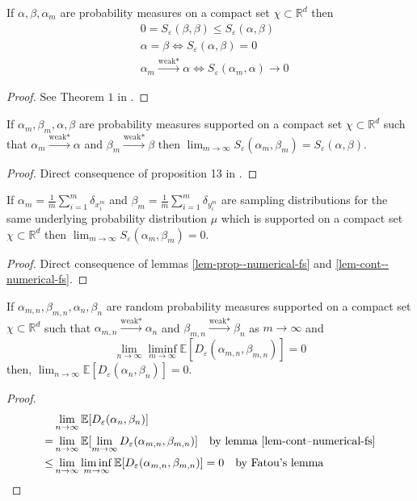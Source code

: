 \begin{lem} If $\alpha, \beta, \alpha_m$ are probability measures on a compact set $\chi\subset\mathbb R^d$ then
\begin{align}
     & 0=S_\varepsilon(\beta, \beta)\le S_\varepsilon(\alpha, \beta)\\
     & \alpha=\beta\iff S_\varepsilon(\alpha, \beta)=0\\
     & \alpha_m\stackrel{\text{weak*}}{\longrightarrow}\alpha\iff S_\varepsilon(\alpha_m, \alpha)\to0
\end{align}
\begin{proof}
See Theorem $1$ in \cite{feydy2019interpolating}.
\end{proof}
\label{lem-prop--numerical-fs}
\end{lem}

\begin{lem}
If $\alpha_m, \beta_m, \alpha, \beta$ are probability measures supported on a compact set $\chi\subset\mathbb R^d$ such that $\alpha_m\stackrel{\text{weak*}}{\longrightarrow}\alpha$ and $\beta_m\stackrel{\text{weak*}}{\longrightarrow}\beta$ then $\lim_{m\to\infty}S_\varepsilon(\alpha_m, \beta_m)= S_\varepsilon(\alpha, \beta)$.
\label{lem-cont--numerical-fs}
\end{lem}
\begin{proof} Direct consequence of proposition 13 in \cite{feydy2019interpolating}.
\end{proof}
\begin{thm}
If $\alpha_m =\frac{1}{m}\sum_{i=1}^m\delta_{x^m_i}$ and $\beta_m=\frac{1}{m}\sum_{i=1}^m\delta_{y^m_i}$ are sampling distributions for the same underlying probability distribution $\mu$ which is supported on a compact set $\chi\subset\mathbb R^d$ then $\lim_{m\to\infty}S_\varepsilon(\alpha_m, \beta_m)=0$.
\label{thm-zero--numerical-fs}
\end{thm}
\begin{proof}
Direct consequence of lemmas \ref{lem-prop--numerical-fs} and \ref{lem-cont--numerical-fs}.
\end{proof}
\begin{thm}
If $\alpha_{m,n}, \beta_{m,n}, \alpha_n, \beta_n$ are random probability measures supported on a compact set $\chi\subset\mathbb R^d$ such that $\alpha_{m,n}\stackrel{\text{weak*}}{\longrightarrow}\alpha_n$ and $\beta_{m,n}\stackrel{\text{weak*}}{\longrightarrow}\beta_n$ as $m\to\infty$ and $$\lim_{n\to\infty}\liminf_{m\to\infty}\mathbb E [ D_\varepsilon(\alpha_{m,n}, \beta_{m, n})]=0$$ then, $\lim_{n\to\infty}\mathbb E[D_\varepsilon(\alpha_n, \beta_n)]=0$.\\
\begin{proof}
\begin{align*}
   &\lim_{n\to\infty}\mathbb E[D_\varepsilon(\alpha_n, \beta_n)]\\
    =& \lim_{n\to\infty}\mathbb E[\lim_{m\to\infty}D_\varepsilon(\alpha_{m,n}, \beta_{m,n})]\quad\text{by lemma }\ref{lem-cont--numerical-fs}\\
    \le&\lim_{n\to\infty}\liminf_{m\to\infty}\mathbb E[D_\varepsilon(\alpha_{m,n}, \beta_{m,n})]=0\quad\text{by Fatou's lemma}
\end{align*}
\end{proof}
\label{thm-stable--numerical-fs}
\end{thm}
